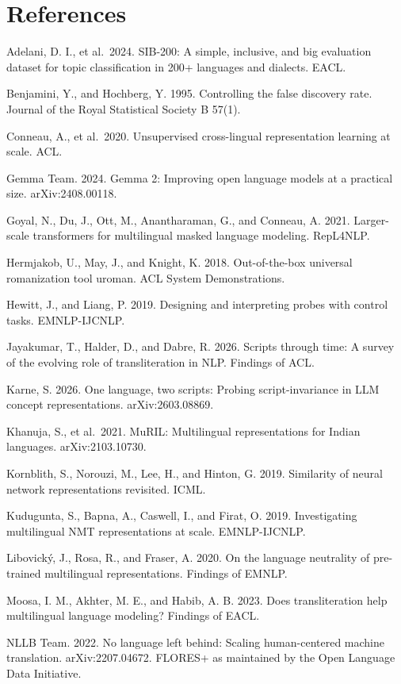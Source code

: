 \hypertarget{references}{%
\section{References}\label{references}}

Adelani, D. I., et al.~2024. SIB-200: A simple, inclusive, and big
evaluation dataset for topic classification in 200+ languages and
dialects. EACL.

Benjamini, Y., and Hochberg, Y. 1995. Controlling the false discovery
rate. Journal of the Royal Statistical Society B 57(1).

Conneau, A., et al.~2020. Unsupervised cross-lingual representation
learning at scale. ACL.

Gemma Team. 2024. Gemma 2: Improving open language models at a practical
size. arXiv:2408.00118.

Goyal, N., Du, J., Ott, M., Anantharaman, G., and Conneau, A. 2021.
Larger-scale transformers for multilingual masked language modeling.
RepL4NLP.

Hermjakob, U., May, J., and Knight, K. 2018. Out-of-the-box universal
romanization tool uroman. ACL System Demonstrations.

Hewitt, J., and Liang, P. 2019. Designing and interpreting probes with
control tasks. EMNLP-IJCNLP.

Jayakumar, T., Halder, D., and Dabre, R. 2026. Scripts through time: A
survey of the evolving role of transliteration in NLP. Findings of ACL.

Karne, S. 2026. One language, two scripts: Probing script-invariance in
LLM concept representations. arXiv:2603.08869.

Khanuja, S., et al.~2021. MuRIL: Multilingual representations for Indian
languages. arXiv:2103.10730.

Kornblith, S., Norouzi, M., Lee, H., and Hinton, G. 2019. Similarity of
neural network representations revisited. ICML.

Kudugunta, S., Bapna, A., Caswell, I., and Firat, O. 2019. Investigating
multilingual NMT representations at scale. EMNLP-IJCNLP.

Libovický, J., Rosa, R., and Fraser, A. 2020. On the language neutrality
of pre-trained multilingual representations. Findings of EMNLP.

Moosa, I. M., Akhter, M. E., and Habib, A. B. 2023. Does transliteration
help multilingual language modeling? Findings of EACL.

NLLB Team. 2022. No language left behind: Scaling human-centered machine
translation. arXiv:2207.04672. FLORES+ as maintained by the Open
Language Data Initiative.

